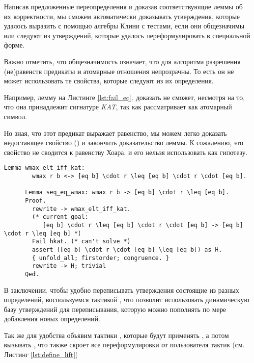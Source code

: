 \documentclass[times
              ,specification
              ,annotation
              ]{itmo-student-thesis}
\begin{document}
      Написав предложенные переопределения и доказав соответствующие леммы об их корректности, мы сможем
      автоматически доказывать утверждения, которые удалось выразить с помощью
      алгебры Клини с тестами, если они общезначимы или следуют из утверждений, которые удалось
      переформулировать в специальной форме.

      Важно отметить, что общезначимость означает, что для алгоритма разрешения (не)равенств предикаты
      и атомарные отношения непрозрачны. То есть он не может использовать те свойства, которые следуют
      из их определения.

      Например, лемму  на Листинге \ref{lst:fail_eq},
       доказать не сможет, несмотря на то, что она принадлежит сигнатуре \textit{KAT}, так
      как рассматривает  как атомарный символ.

      Но зная, что этот предикат  выражает равенство, мы можем легко доказать
      недостающее свойство ()
      и закончить доказательство леммы. К сожалению, это свойство не сводится к равенству Хоара, и его нельзя использовать как гипотезу.
      \begin{lstlisting}[float=!h, gobble=6,
        caption={Пример невозможного использования hkat из-за нехватки гипотезы о внутреннем устройстве
        предиката}, label={lst:fail_eq}]
      Lemma wmax_elt_iff_kat:
        wmax r b <-> [eq b] \cdot r \leq [eq b] \cdot r \cdot [eq b].

      Lemma seq_eq_wmax: wmax r b -> [eq b] \cdot r \leq [eq b].
      Proof.
        rewrite -> wmax_elt_iff_kat.
        (* current goal:
           [eq b] \cdot r \leq [eq b] \cdot r \cdot [eq b] -> [eq b] \cdot r \leq [eq b] *)
        Fail hkat. (* can't solve *)
        assert ([eq b] \cdot r \cdot [eq b] \leq [eq b]) as H.
        { unfold_all; firstorder; congruence. }
        rewrite -> H; trivial
      Qed.
      \end{lstlisting}

      В заключении, чтобы удобно переписывать утверждения состоящие из разных определений, воспользуемся
      тактикой  \cite{coq_man}, что позволит использовать динамическую базу
      утверждений для переписывания, которую можно пополнять по мере добавления новых определений.
    
      Так же для удобства объявим тактики , которые будут применять ,
      а потом вызывать , что также скроет все переформулировки от
      пользователя тактик (см. Листинг \ref{lst:define_lift})
\end{document}
